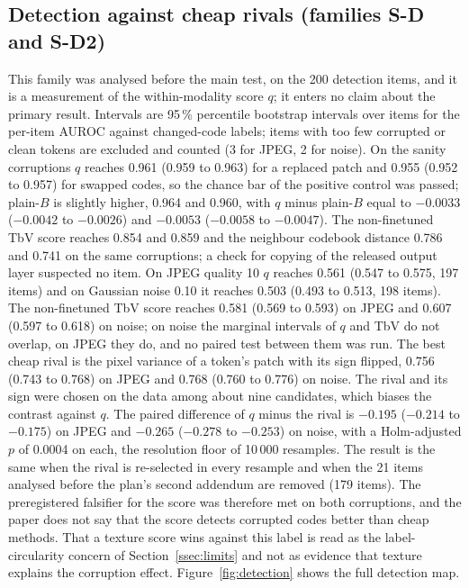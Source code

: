\subsection{Detection against cheap rivals (families S-D and S-D2)}\label{ssec:res_det}
This family was analysed before the main test, on the 200 detection items, and it is a measurement of the within-modality score $q$;
it enters no claim about the primary result.
Intervals are 95\,\% percentile bootstrap intervals over items for the per-item AUROC against changed-code labels; items with too
few corrupted or clean tokens are excluded and counted (3 for JPEG, 2 for noise).
On the sanity corruptions $q$ reaches 0.961 (0.959 to 0.963) for a replaced patch and 0.955 (0.952 to 0.957) for swapped codes, so the
chance bar of the positive control was passed; plain-$B$ is slightly higher, 0.964 and 0.960, with $q$ minus plain-$B$ equal to
$-0.0033$ ($-0.0042$ to $-0.0026$) and $-0.0053$ ($-0.0058$ to $-0.0047$).
The non-finetuned TbV score reaches 0.854 and 0.859 and the neighbour codebook distance 0.786 and 0.741 on the same corruptions; a
check for copying of the released output layer suspected no item.
On JPEG quality 10 $q$ reaches 0.561 (0.547 to 0.575, 197 items) and on Gaussian noise 0.10 it reaches 0.503 (0.493 to 0.513, 198
items).
The non-finetuned TbV score reaches 0.581 (0.569 to 0.593) on JPEG and 0.607 (0.597 to 0.618) on noise; on noise the marginal
intervals of $q$ and TbV do not overlap, on JPEG they do, and no paired test between them was run.
The best cheap rival is the pixel variance of a token's patch with its sign flipped, 0.756 (0.743 to 0.768) on JPEG and 0.768 (0.760
to 0.776) on noise.
The rival and its sign were chosen on the data among about nine candidates, which biases the contrast against $q$.
The paired difference of $q$ minus the rival is $-0.195$ ($-0.214$ to $-0.175$) on JPEG and $-0.265$ ($-0.278$ to $-0.253$) on noise,
with a Holm-adjusted $p$ of 0.0004 on each, the resolution floor of 10\,000 resamples.
The result is the same when the rival is re-selected in every resample and when the 21 items analysed before the plan's second
addendum are removed (179 items).
The preregistered falsifier for the score was therefore met on both corruptions, and the paper does not say that the score detects
corrupted codes better than cheap methods.
That a texture score wins against this label is read as the label-circularity concern of Section~\ref{ssec:limits} and not as
evidence that texture explains the corruption effect.
Figure~\ref{fig:detection} shows the full detection map.

